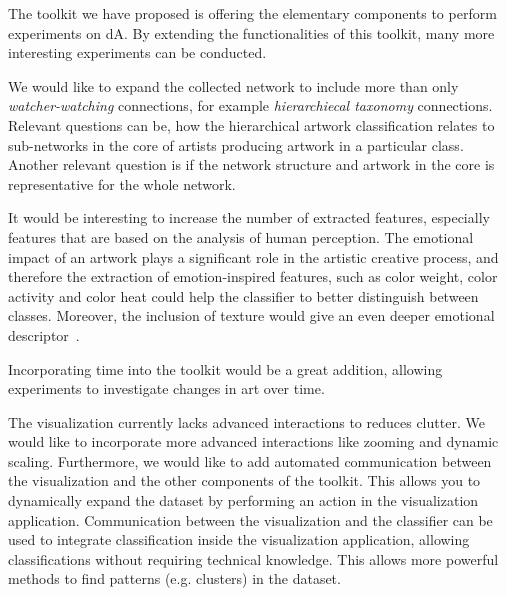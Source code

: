 The toolkit we have proposed is offering the elementary components to perform experiments on dA.
By extending the functionalities of this toolkit, many more interesting experiments can be conducted.

We would like to expand the collected network to include more than only \textit{watcher-watching} connections, for example \textit{hierarchiecal taxonomy} connections.
Relevant questions can be, how the hierarchical artwork classification relates to sub-networks in the core of artists producing artwork in a particular class.
Another relevant question is if the network structure and artwork in the core is representative for the whole network.

It would be interesting to increase the number of extracted features, especially features that are based on the analysis of human perception.
The emotional impact of an artwork plays a significant role in the artistic creative process, and therefore the extraction of emotion-inspired features, such as color weight, color activity and color heat \cite{color_emotion1} could help the classifier to better distinguish between classes.
Moreover, the inclusion of texture would give an even deeper emotional descriptor~\cite{LucassenECCGIV2010}.

Incorporating time into the toolkit would be a great addition, allowing experiments to investigate changes in art over time.

The visualization currently lacks advanced interactions to reduces clutter.
We would like to incorporate more advanced interactions like zooming and dynamic scaling.
Furthermore, we would like to add automated communication between the visualization and the other components of the toolkit.
This allows you to dynamically expand the dataset by performing an action in the visualization application.
Communication between the visualization and the classifier can be used to integrate classification inside the visualization application, allowing classifications without requiring technical knowledge.
This allows more powerful methods to find patterns (e.g. clusters) in the dataset.


